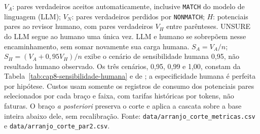 \noindent\parbox{\linewidth}{\footnotesize $V_A$: pares verdadeiros aceitos automaticamente, inclusive \texttt{MATCH} do modelo de linguagem (LLM); $V_N$: pares verdadeiros perdidos por \texttt{NONMATCH}; $H$: potenciais pares ao revisor humano, com pares verdadeiros $V_H$ entre parênteses. UNSURE do LLM segue ao humano uma única vez. LLM e humano se sobrepõem nesse encaminhamento, sem somar novamente sua carga humana. $S_A=V_A/n$; $S_H=(V_A+0{,}95V_H)/n$ exibe o cenário de sensibilidade humana 0,95, não resultado humano observado. Os três cenários, 0,95, 0,99 e 1,00, constam da Tabela~\ref{tab:cap8-sensibilidade-humana} e de ; a especificidade humana é perfeita por hipótese. Custos usam somente os registros de consumo dos potenciais pares selecionados por cada braço e faixa, com tarifas históricas por tokens, não faturas. O braço \textit{a posteriori} preserva o corte e aplica a cascata sobre a base inteira abaixo dele, sem recalibração. Fonte: \texttt{data/arranjo\_corte\_metricas.csv} e \texttt{data/arranjo\_corte\_par2.csv}.}
